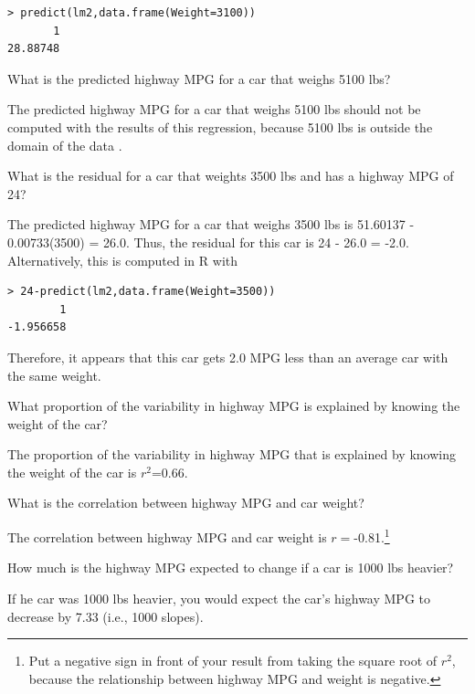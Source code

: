 \documentclass[10pt,openany]{book}\usepackage[]{graphicx}\usepackage[]{color}
\makeatletter
\newenvironment{kframe}{%
 \def\at@end@of@kframe{}%
 \ifinner\ifhmode%
  \def\at@end@of@kframe{\end{minipage}}%
  \begin{minipage}{\columnwidth}%
 \fi\fi%
 \def\FrameCommand##1{\hskip\@totalleftmargin \hskip-\fboxsep
 \colorbox{shadecolor}{##1}\hskip-\fboxsep
     \hskip-\linewidth \hskip-\@totalleftmargin \hskip\columnwidth}%
 \MakeFramed {\advance\hsize-\width
   \@totalleftmargin\z@ \linewidth\hsize
   \@setminipage}}%
 {\par\unskip\endMakeFramed%
 \at@end@of@kframe}
\newenvironment{knitrout}{}{} %
\makeatother
\begin{document}
\begin{QAlist}
\begin{QAlist}
\begin{knitrout}
\begin{kframe}
\begin{verbatim}
> predict(lm2,data.frame(Weight=3100))
       1 
28.88748 
\end{verbatim}
\end{kframe}
\end{knitrout}
  \end{QAlist}
  \item What is the predicted highway MPG for a car that weighs 5100 lbs?
  \begin{QAlist}
    \item The predicted highway MPG for a car that weighs 5100 lbs should not be computed with the results of this regression, because 5100 lbs is outside the domain of the data .
  \end{QAlist}
  \item What is the residual for a car that weights 3500 lbs and has a highway MPG of 24?
  \begin{QAlist}
    \item The predicted highway MPG for a car that weighs 3500 lbs is 51.60137 - 0.00733(3500) = 26.0.  Thus, the residual for this car is 24 - 26.0 = -2.0.  Alternatively, this is computed in R with
\begin{knitrout}
\color{fgcolor}\begin{kframe}
\begin{verbatim}
> 24-predict(lm2,data.frame(Weight=3500))
        1 
-1.956658 
\end{verbatim}
\end{kframe}
\end{knitrout}
Therefore, it appears that this car gets 2.0 MPG less than an average car with the same weight.
  \end{QAlist}
  \item What proportion of the variability in highway MPG is explained by knowing the weight of the car?
  \begin{QAlist}
    \item The proportion of the variability in highway MPG that is explained by knowing the weight of the car is $r^{2}$=0.66.
  \end{QAlist}
  \item What is the correlation between highway MPG and car weight?
  \begin{QAlist}
    \item The correlation between highway MPG and car weight is $r=$-0.81.\footnote{Put a negative sign in front of your result from taking the square root of $r^2$, because the relationship between highway MPG and weight is negative.}
  \end{QAlist}
  \item How much is the highway MPG expected to change if a car is 1000 lbs heavier?
  \begin{QAlist}
    \item If he car was 1000 lbs heavier, you would expect the car's highway MPG to decrease by 7.33 (i.e., 1000 slopes).
  \end{QAlist}
\end{QAlist}
\end{document}
